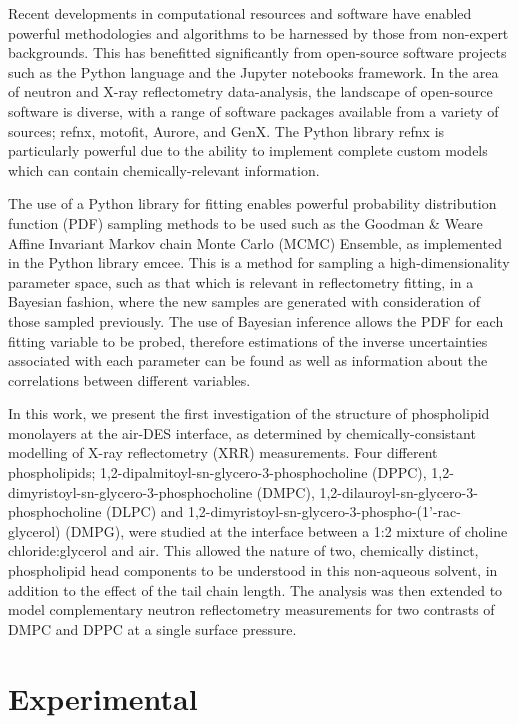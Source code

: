 \documentclass[twoside,twocolumn,9pt]{article}
\begin{document}
Recent developments in computational resources and software have enabled powerful methodologies and algorithms to be harnessed by those from non-expert backgrounds. This has benefitted significantly from open-source software projects such as the Python language\cite{vanRossum1995} and the Jupyter notebooks framework.\cite{Kluyver2016} In the area of neutron and X-ray reflectometry data-analysis, the landscape of open-source software is diverse, with a range of software packages available from a variety of sources; refnx\cite{Nelson2018}, motofit,\cite{Nelson2006} Aurore,\cite{Gerelli2016} and GenX.\cite{Bjorck2007} The Python library refnx is particularly powerful due to the ability to implement complete custom models which can contain chemically-relevant information.

The use of a Python library for fitting enables powerful probability distribution function (PDF) sampling methods to be used such as the Goodman \& Weare Affine Invariant Markov chain Monte Carlo (MCMC) Ensemble,\cite{Goodman2010} as implemented in the Python library emcee.\cite{Foreman-Mackey2013} This is a method for sampling a high-dimensionality parameter space, such as that which is relevant in reflectometry fitting, in a Bayesian fashion, where the new samples are generated with consideration of those sampled previously. The use of Bayesian inference allows the PDF for each fitting variable to be probed, therefore estimations of the inverse uncertainties associated with each parameter can be found as well as information about the correlations between different variables.

In this work, we present the first investigation of the structure of phospholipid monolayers at the air-DES interface, as determined by chemically-consistant modelling of X-ray reflectometry (XRR) measurements. Four different phospholipids; 1,2-dipalmitoyl-sn-glycero-3-phosphocholine (DPPC), 1,2-dimyristoyl-sn-glycero-3-phosphocholine (DMPC),  1,2-dilauroyl-sn-glycero-3-phosphocholine (DLPC) and 1,2-dimyristoyl-sn-glycero-3-phospho-(1'-rac-glycerol) (DMPG), were studied at the interface between a 1:2 mixture of choline chloride:glycerol and air. This allowed the nature of two, chemically distinct, phospholipid head components to be understood in this non-aqueous solvent, in addition to the effect of the tail chain length. The analysis was then extended to model complementary neutron reflectometry measurements for two contrasts of DMPC and DPPC at a single surface pressure.

\section{Experimental}
\end{document}
